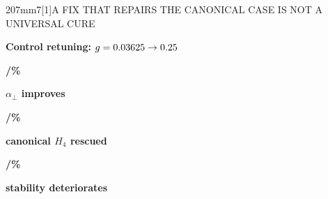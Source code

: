 \documentclass[final]{beamer}
\newcommand{\Subhead}{\PosterCondensed\bfseries\fontsize{38pt}{41pt}\selectfont}
\newcommand{\MetricSize}{\fontsize{38pt}{42pt}\selectfont}
\newcommand{\TableSize}{\fontsize{26pt}{29pt}\selectfont}
\begin{document}
\begin{frame}[t]
\noindent\hspace*{6mm}%
\begin{minipage}[t][207mm][t]{450mm}\vspace{0pt}
  \begin{PosterPanel}{207mm}{7}{\scalebox{0.79}[1]{A FIX THAT REPAIRS THE CANONICAL CASE IS NOT A UNIVERSAL CURE}}
    \noindent\begin{minipage}[t]{\linewidth}\vspace{0pt}
      {\Subhead\color{IASDarkGreen}Control retuning: $g=0.03625\to0.25$\par}
      \noindent\begin{minipage}[c][30mm][c]{137mm}\centering
        \colorbox{IASPaleGreen}{\parbox[c][27mm][c]{132mm}{\centering
          {\MetricSize\bfseries\color{IASMidGreen}\InterventionImproves/\NumValidMC\quad\InterventionImprovesPercent\%\par}
          {\TableSize\bfseries\color{IASDarkText}$\alpha_{\perp}$ improves\par}}}
      \end{minipage}\hspace{2mm}%
      \begin{minipage}[c][30mm][c]{137mm}\centering
        \colorbox{IASPaleGreen}{\parbox[c][27mm][c]{132mm}{\centering
          {\MetricSize\bfseries\color{IASBlue}\InterventionRescues/\NumValidMC\quad\InterventionRescuesPercent\%\par}
          {\TableSize\bfseries\color{IASDarkText}canonical $H_4$ rescued\par}}}
      \end{minipage}\hspace{2mm}%
      \begin{minipage}[c][30mm][c]{137mm}\centering
        \colorbox{IASPaleGold}{\parbox[c][27mm][c]{132mm}{\centering
          {\MetricSize\bfseries\color{IASVermillion}\InterventionDeteriorates/\NumValidMC\quad\InterventionDeterioratesPercent\%\par}
          {\TableSize\bfseries\color{IASDarkText}stability deteriorates\par}}}
      \end{minipage}\par
    \end{minipage}\par
    \vspace{1mm}
    \noindent\begin{minipage}[t]{215mm}\centering\vspace{0pt}

\end{minipage}
\end{PosterPanel}
\end{minipage}
\end{frame}
\end{document}
